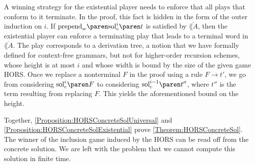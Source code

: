 \documentclass[../../diss.tex]{subfiles}
\begin{document}
A winning strategy for the existential player needs to enforce that all plays that conform to it terminate.
In the proof, this fact is hidden in the form of the outer induction on $i$.
If $\prepend{w}{\solc{i}{t}}$ is satisfied by $\overline{\lang{A}}$, then the existential player can enforce a terminating play that leads to a terminal word in $\overline{\lang{A}}$.
The play corresponds to a derivation tree, a notion that we have formally defined for context-free grammars, but not for higher-order recursion schemes, whose height is at most $i$ and whose width is bound by the size of the given game HORS.\@
Once we replace a nonterminal $F$ in the proof using a rule $F \to t'$, we go from considering $\solc{i}{F}$ to considering $\solc{i-1}{t''}$, where $t''$ is the term resulting from replacing $F$.
This yields the aforementioned bound on the height.

Together, \cref{Proposition:HORSConcreteSolUniversal} and \cref{Proposition:HORSConcreteSolExistential} prove \cref{Theorem:HORSConcreteSol}.
The winner of the inclusion game induced by the HORS can be read off from the concrete solution.
We are left with the problem that we cannot compute this solution in finite time.
\end{document}
